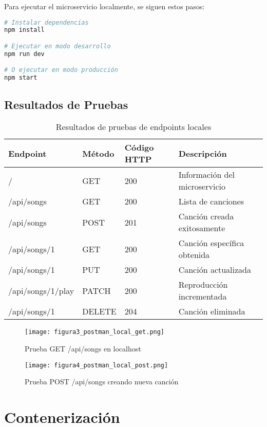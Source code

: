 \documentclass[12pt,a4paper]{article}
\begin{document}
Para ejecutar el microservicio localmente, se siguen estos pasos:

\begin{lstlisting}[language=bash, caption=Comandos para ejecutar localmente]
# Instalar dependencias
npm install

# Ejecutar en modo desarrollo
npm run dev

# O ejecutar en modo producción
npm start
\end{lstlisting}

\subsection{Resultados de Pruebas}

\begin{table}[H]
\centering
\caption{Resultados de pruebas de endpoints locales}
\begin{tabular}{@{}llll@{}}
\toprule
\textbf{Endpoint} & \textbf{Método} & \textbf{Código HTTP} & \textbf{Descripción} \\
\midrule
/ & GET & 200 & Información del microservicio \\
/api/songs & GET & 200 & Lista de canciones \\
/api/songs & POST & 201 & Canción creada exitosamente \\
/api/songs/1 & GET & 200 & Canción específica obtenida \\
/api/songs/1 & PUT & 200 & Canción actualizada \\
/api/songs/1/play & PATCH & 200 & Reproducción incrementada \\
/api/songs/1 & DELETE & 204 & Canción eliminada \\
\bottomrule
\end{tabular}
\end{table}

\begin{figure}[H]
\centering
\texttt{[image: figura3\_postman\_local\_get.png]}
\caption{Prueba GET /api/songs en localhost}
\end{figure}

\begin{figure}[H]
\centering
\texttt{[image: figura4\_postman\_local\_post.png]}
\caption{Prueba POST /api/songs creando nueva canción}
\end{figure}

\section{Contenerización}
\end{document}
